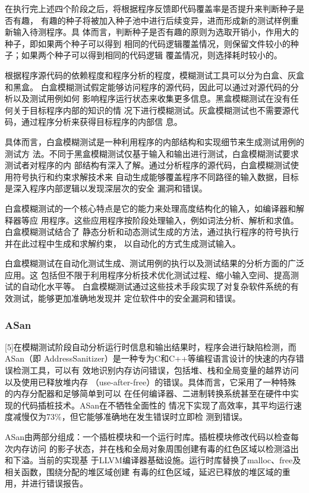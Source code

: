 在执行完上述四个阶段之后，将根据程序反馈即代码覆盖率是否提升来判断种子是否有趣，
有趣的种子将被加入种子池中进行后续变异，进而形成新的测试样例重新输入待测程序。具
体而言，判断种子是否有趣的原则为选取开销小，作用大的种子，即如果两个种子可以得到
相同的代码逻辑覆盖情况，则保留文件较小的种子；如果两个种子可以得到相同的代码逻辑
覆盖情况，则选择耗时较小的。

根据程序源代码的依赖程度和程序分析的程度，模糊测试工具可以分为白盒、灰盒和黑盒。
白盒模糊测试假定能够访问程序的源代码，因此可以通过对源代码的分析以及测试用例如何
影响程序运行状态来收集更多信息。黑盒模糊测试在没有任何关于目标程序内部的知识的情
况下进行模糊测试。灰盒模糊测试也不需要源代码，通过程序分析来获得目标程序的内部信
息。

具体而言，白盒模糊测试是一种利用程序的内部结构和实现细节来生成测试用例的测试方
法。不同于黑盒模糊测试仅基于输入和输出进行测试，白盒模糊测试要求测试者对程序的内
部结构有深入了解。通过分析程序的源代码，白盒模糊测试使用符号执行和约束求解技术来
自动生成能够覆盖程序不同路径的输入数据，目标是深入程序内部逻辑以发现深层次的安全
漏洞和错误。

白盒模糊测试的一个核心特点是它的能力来处理高度结构化的输入，如编译器和解释器等应
用程序。这些应用程序按阶段处理输入，例如词法分析、解析和求值。白盒模糊测试结合了
静态分析和动态测试生成的方法，通过执行程序的符号执行并在此过程中生成和求解约束，
以自动化的方式生成测试输入。

白盒模糊测试在自动化测试生成、测试用例的执行以及测试结果的分析方面的广泛应用。这
包括但不限于利用程序分析技术优化测试过程、缩小输入空间、提高测试的自动化水平等。
白盒模糊测试通过这些技术手段实现了对复杂软件系统的有效测试，能够更加准确地发现并
定位软件中的安全漏洞和错误。

\subsubsection{ASan}

[5]在模糊测试阶段自动分析运行时信息和输出结果时，程序会进行缺陷检测，而ASan（即
AddressSanitizer）是一种专为C和C++等编程语言设计的快速的内存错误检测工具，可以有
效地识别内存访问错误，包括堆、栈和全局变量的越界访问以及使用已释放堆内存
（use-after-free）的错误。具体而言，它采用了一种特殊的内存分配器和足够简单到可以
在任何编译器、二进制转换系统甚至在硬件中实现的代码插桩技术。ASan在不牺牲全面性的
情况下实现了高效率，其平均运行速度减慢仅为73\%，但它能够准确地在发生错误时立即检
测到错误。

ASan由两部分组成：一个插桩模块和一个运行时库。插桩模块修改代码以检查每次内存访问
的影子状态，并在栈和全局对象周围创建有毒的红色区域以检测溢出和下溢。当前的实现基
于LLVM编译器基础设施。运行时库替换了malloc、free及相关函数，围绕分配的堆区域创建
有毒的红色区域，延迟已释放的堆区域的重用，并进行错误报告。

